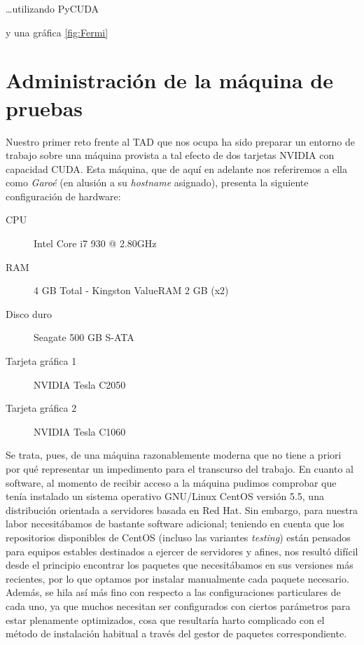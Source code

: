\documentclass[twoside]{article}
\begin{document}
\ldots utilizando PyCUDA~\cite{DBLP:journals/corr/abs-0911-3456}

y una gráfica \ref{fig:Fermi}


\section{Administración de la máquina de pruebas}

Nuestro primer reto frente al TAD que nos ocupa ha sido preparar un entorno de trabajo sobre una máquina provista a tal efecto de dos tarjetas NVIDIA con capacidad CUDA. Esta máquina, que de aquí en adelante nos referiremos a ella como \emph{Garoé} (en alusión a su \emph{hostname} asignado), presenta la siguiente configuración de hardware:

\begin{description}
   \item[CPU] Intel Core i7 930 @ 2.80GHz
   \item[RAM] 4 GB Total - Kingston ValueRAM 2 GB (x2)
   \item[Disco duro] Seagate 500 GB S-ATA
   \item[Tarjeta gráfica 1] NVIDIA Tesla C2050
   \item[Tarjeta gráfica 2] NVIDIA Tesla C1060
\end{description}

Se trata, pues, de una máquina razonablemente moderna que no tiene a priori por qué representar un impedimento para el transcurso del trabajo. En cuanto al software, al momento de recibir acceso a la máquina pudimos comprobar que tenía instalado un sistema operativo GNU/Linux CentOS versión 5.5, una distribución orientada a servidores basada en Red Hat. Sin embargo, para nuestra labor necesitábamos de bastante software adicional; teniendo en cuenta que los repositorios disponibles de CentOS (incluso las variantes \emph{testing}) están pensados para equipos estables destinados a ejercer de servidores y afines, nos resultó difícil desde el principio encontrar los paquetes que necesitábamos en sus versiones más recientes, por lo que optamos por instalar manualmente cada paquete necesario. Además, se hila así más fino con respecto a las configuraciones particulares de cada uno, ya que muchos necesitan ser configurados con ciertos parámetros para estar plenamente optimizados, cosa que resultaría harto complicado con el método de instalación habitual a través del gestor de paquetes correspondiente.
\end{document}
